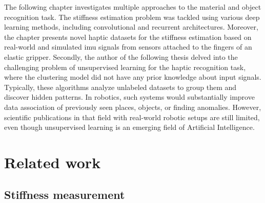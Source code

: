 \documentclass[a4paper, 10pt, twoside]{report}
\begin{document}
The following chapter investigates multiple approaches to the material and object recognition task. The stiffness estimation problem was tackled using various deep learning methods, including convolutional and recurrent architectures. Moreover, the chapter presents novel haptic datasets for the stiffness estimation based on real-world and simulated \acrshort{imu} signals from sensors attached to the fingers of an elastic gripper. Secondly, the author of the following thesis delved into the challenging problem of unsupervised learning for the haptic recognition task, where the clustering model did not have any prior knowledge about input signals. Typically, these algorithms analyze unlabeled datasets to group them and discover hidden patterns. In robotics, such systems would substantially improve data association of previously seen places, objects, or finding anomalies. However, scientific publications in that field with real-world robotic setups are still limited, even though unsupervised learning is an emerging field of Artificial Intelligence.

\section{Related work}
\label{part:methods:materials:rw}

\subsection{Stiffness measurement}
\label{part:methods:materials:rw:measurements}
\end{document}
